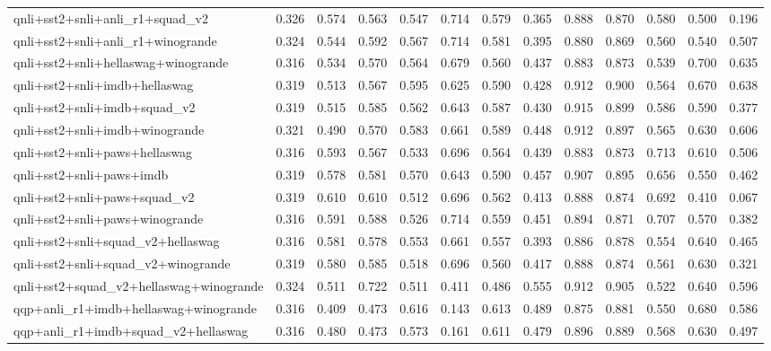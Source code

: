 \begin{table}[t]
\begin{tabular}{lrrrrrrrrrrrr}
    qnli+sst2+snli+anli\_r1+squad\_v2 & 0.326 & 0.574 & 0.563 & 0.547 & 0.714 & 0.579 & 0.365 & 0.888 & 0.870 & 0.580 & 0.500 & 0.196 \\
    qnli+sst2+snli+anli\_r1+winogrande & 0.324 & 0.544 & 0.592 & 0.567 & 0.714 & 0.581 & 0.395 & 0.880 & 0.869 & 0.560 & 0.540 & 0.507 \\
    qnli+sst2+snli+hellaswag+winogrande & 0.316 & 0.534 & 0.570 & 0.564 & 0.679 & 0.560 & 0.437 & 0.883 & 0.873 & 0.539 & 0.700 & 0.635 \\
    qnli+sst2+snli+imdb+hellaswag & 0.319 & 0.513 & 0.567 & 0.595 & 0.625 & 0.590 & 0.428 & 0.912 & 0.900 & 0.564 & 0.670 & 0.638 \\
    qnli+sst2+snli+imdb+squad\_v2 & 0.319 & 0.515 & 0.585 & 0.562 & 0.643 & 0.587 & 0.430 & 0.915 & 0.899 & 0.586 & 0.590 & 0.377 \\
    qnli+sst2+snli+imdb+winogrande & 0.321 & 0.490 & 0.570 & 0.583 & 0.661 & 0.589 & 0.448 & 0.912 & 0.897 & 0.565 & 0.630 & 0.606 \\
    qnli+sst2+snli+paws+hellaswag & 0.316 & 0.593 & 0.567 & 0.533 & 0.696 & 0.564 & 0.439 & 0.883 & 0.873 & 0.713 & 0.610 & 0.506 \\
    qnli+sst2+snli+paws+imdb & 0.319 & 0.578 & 0.581 & 0.570 & 0.643 & 0.590 & 0.457 & 0.907 & 0.895 & 0.656 & 0.550 & 0.462 \\
    qnli+sst2+snli+paws+squad\_v2 & 0.319 & 0.610 & 0.610 & 0.512 & 0.696 & 0.562 & 0.413 & 0.888 & 0.874 & 0.692 & 0.410 & 0.067 \\
    qnli+sst2+snli+paws+winogrande & 0.316 & 0.591 & 0.588 & 0.526 & 0.714 & 0.559 & 0.451 & 0.894 & 0.871 & 0.707 & 0.570 & 0.382 \\
    qnli+sst2+snli+squad\_v2+hellaswag & 0.316 & 0.581 & 0.578 & 0.553 & 0.661 & 0.557 & 0.393 & 0.886 & 0.878 & 0.554 & 0.640 & 0.465 \\
    qnli+sst2+snli+squad\_v2+winogrande & 0.319 & 0.580 & 0.585 & 0.518 & 0.696 & 0.560 & 0.417 & 0.888 & 0.874 & 0.561 & 0.630 & 0.321 \\
    qnli+sst2+squad\_v2+hellaswag+winogrande & 0.324 & 0.511 & 0.722 & 0.511 & 0.411 & 0.486 & 0.555 & 0.912 & 0.905 & 0.522 & 0.640 & 0.596 \\
    qqp+anli\_r1+imdb+hellaswag+winogrande & 0.316 & 0.409 & 0.473 & 0.616 & 0.143 & 0.613 & 0.489 & 0.875 & 0.881 & 0.550 & 0.680 & 0.586 \\
    qqp+anli\_r1+imdb+squad\_v2+hellaswag & 0.316 & 0.480 & 0.473 & 0.573 & 0.161 & 0.611 & 0.479 & 0.896 & 0.889 & 0.568 & 0.630 & 0.497 \\

\end{tabular}
\end{table}
